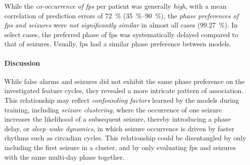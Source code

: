 While the \textit{co-occurrence of \glspl{fp}} per patient was generally \textit{high}, with a mean correlation of prediction errors of \SI{72}{\percent} (\SIrange{35}{90}{\percent}), the \textit{phase preferences of \glspl{fp} and seizures} were \textit{not significantly similar} in almost all cases (\SI{99.27}{\percent}).
In select cases, the preferred phase of \glspl{fp} was systematically delayed compared to that of seizures.
Usually, \Glspl{fp} had a similar phase preference between models.


\paragraph{Discussion}
While false alarms and seizures did not exhibit the same phase preference on the investigated feature cycles, they revealed a more intricate pattern of association. 
This relationship may reflect \textit{confounding factors} learned by the models during training, including \textit{seizure clustering}, where the occurrence of one seizure increases the likelihood of a subsequent seizure, thereby introducing a phase delay, or \textit{sleep–wake dynamics}, in which seizure occurrence is driven by faster rhythms such as circadian cycles.
This relationship could be disentangled by only including the first seizure in a cluster, and by only evaluating \glspl{fp} and seizures with the same multi-day phase together.

\endgroup
\glsresetall
